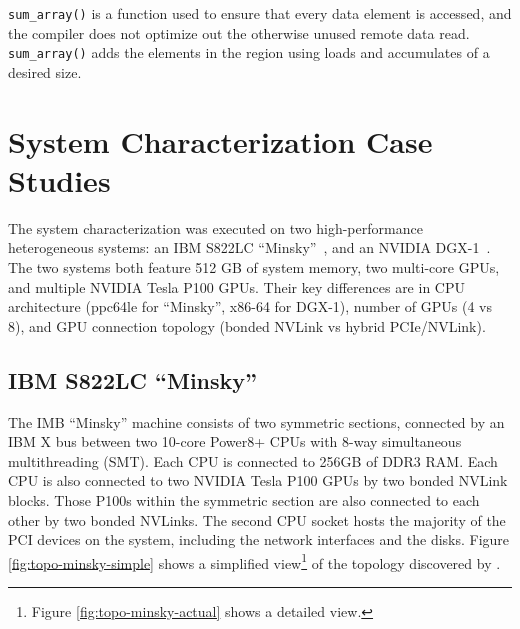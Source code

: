 \texttt{sum\_array()} is a function used to ensure that every data element is accessed, and the compiler does not optimize out the otherwise unused remote data read.
\texttt{sum\_array()} adds the elements in the region using loads and accumulates of a desired size.

%
%
\section{System Characterization Case Studies}

The system characterization was executed on two high-performance heterogeneous systems: an IBM S822LC ``Minsky''~\cite{ibm2015minsky}, and an NVIDIA DGX-1~\cite{nvidia2016dgx1}.
The two systems both feature 512 GB of system memory, two multi-core GPUs, and multiple NVIDIA Tesla P100 GPUs.
Their key differences are in CPU architecture (ppc64le for ``Minsky'', x86-64 for DGX-1), number of GPUs (4 vs 8), and GPU connection topology (bonded NVLink vs hybrid PCIe/NVLink).

\subsection{IBM S822LC ``Minsky''}
\label{sec:topology-minsky}

The IMB ``Minsky'' machine consists of two symmetric sections, connected by an IBM X bus between two 10-core Power8+ CPUs with 8-way simultaneous multithreading (SMT).
Each CPU is connected to 256GB of DDR3 RAM.
Each CPU is also connected to two NVIDIA Tesla P100 GPUs by two bonded NVLink blocks.
Those P100s within the symmetric section are also connected to each other by two bonded NVLinks.
The second CPU socket hosts the majority of the PCI devices on the system, including the network interfaces and the disks.
Figure \ref{fig:topo-minsky-simple} shows a simplified view\footnote{Figure \ref{fig:topo-minsky-actual} shows a detailed view.} of the topology discovered by .


